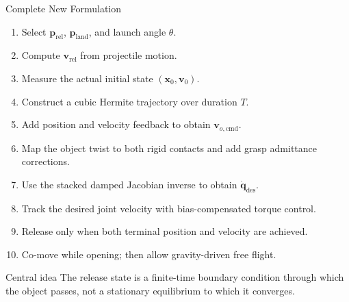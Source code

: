 \documentclass[aspectratio=169]{beamer}
\newcommand{\vect}[1]{\bm{#1}}
\begin{document}
\begin{frame}{Complete New Formulation}

\begin{enumerate}
    \item Select $\vect{p}_{\mathrm{rel}}$, $\vect{p}_{\mathrm{land}}$,
          and launch angle $\theta$.
    \item Compute $\vect{v}_{\mathrm{rel}}$ from projectile motion.
    \item Measure the actual initial state $(\vect{x}_0,\vect{v}_0)$.
    \item Construct a cubic Hermite trajectory over duration $T$.
    \item Add position and velocity feedback to obtain
          $\vect{v}_{o,\mathrm{cmd}}$.
    \item Map the object twist to both rigid contacts and add grasp
          admittance corrections.
    \item Use the stacked damped Jacobian inverse to obtain
          $\dot{\vect{q}}_{\mathrm{des}}$.
    \item Track the desired joint velocity with bias-compensated torque control.
    \item Release only when both terminal position and velocity are achieved.
    \item Co-move while opening; then allow gravity-driven free flight.
\end{enumerate}

\begin{block}{Central idea}
The release state is a finite-time boundary condition through which the
object passes, not a stationary equilibrium to which it converges.
\end{block}

\end{frame}

\end{document}
